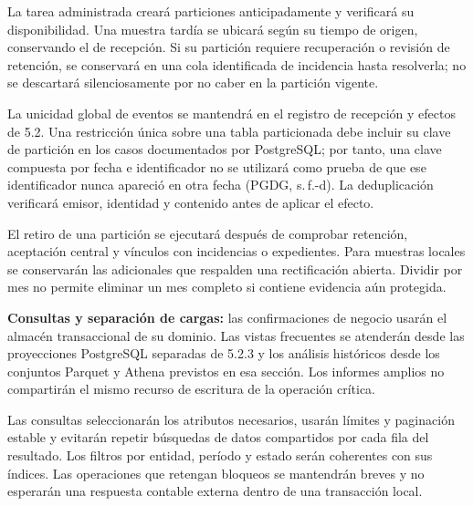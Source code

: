 La tarea administrada creará particiones anticipadamente y verificará su disponibilidad. Una muestra tardía se ubicará según su tiempo de origen, conservando el de recepción. Si su partición requiere recuperación o revisión de retención, se conservará en una cola identificada de incidencia hasta resolverla; no se descartará silenciosamente por no caber en la partición vigente.

La unicidad global de eventos se mantendrá en el registro de recepción y efectos de 5.2. Una restricción única sobre una tabla particionada debe incluir su clave de partición en los casos documentados por PostgreSQL; por tanto, una clave compuesta por fecha e identificador no se utilizará como prueba de que ese identificador nunca apareció en otra fecha (PGDG, s.\,f.-d). La deduplicación verificará emisor, identidad y contenido antes de aplicar el efecto.

El retiro de una partición se ejecutará después de comprobar retención, aceptación central y vínculos con incidencias o expedientes. Para muestras locales se conservarán las adicionales que respalden una rectificación abierta. Dividir por mes no permite eliminar un mes completo si contiene evidencia aún protegida.

\textbf{Consultas y separación de cargas:} las confirmaciones de negocio usarán el almacén transaccional de su dominio. Las vistas frecuentes se atenderán desde las proyecciones PostgreSQL separadas de 5.2.3 y los análisis históricos desde los conjuntos Parquet y Athena previstos en esa sección. Los informes amplios no compartirán el mismo recurso de escritura de la operación crítica.

Las consultas seleccionarán los atributos necesarios, usarán límites y paginación estable y evitarán repetir búsquedas de datos compartidos por cada fila del resultado. Los filtros por entidad, período y estado serán coherentes con sus índices. Las operaciones que retengan bloqueos se mantendrán breves y no esperarán una respuesta contable externa dentro de una transacción local.


